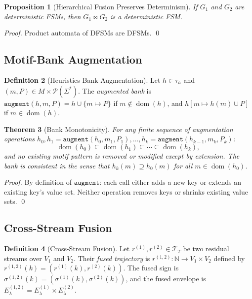 \documentclass[11pt,a4paper]{article}
\theoremstyle{plain}
\newtheorem{theorem}{Theorem}[section]
\newtheorem{proposition}[theorem]{Proposition}
\theoremstyle{definition}
\newtheorem{definition}[theorem]{Definition}
\theoremstyle{remark}
\DeclareMathOperator{\dom}{dom}
\newcommand{\N}{\mathbb{N}}
\begin{document}
\begin{proposition}[Hierarchical Fusion Preserves Determinism]
  If $G_1$ and $G_2$ are deterministic FSMs, then $G_1 \bowtie G_2$ is a deterministic FSM.
\end{proposition}
\begin{proof}
  Product automata of DFSMs are DFSMs. \qed
\end{proof}

\subsection{Motif-Bank Augmentation}

\begin{definition}[Heuristics Bank Augmentation]
  Let $h \in \tau_h$ and $(m, P) \in M \times \mathcal{P}(\Sigma^*)$. The \emph{augmented bank}
  is $\mathtt{augment}(h, m, P) = h \cup \{m \mapsto P\}$ if $m \notin \dom(h)$, and
  $h[m \mapsto h(m) \cup P]$ if $m \in \dom(h)$.
\end{definition}

\begin{theorem}[Bank Monotonicity]
\label{thm:bank_mono}
  For any finite sequence of augmentation operations
  $h_0, h_1 = \mathtt{augment}(h_0, m_1, P_1), \ldots, h_k = \mathtt{augment}(h_{k-1}, m_k, P_k)$:
  \begin{equation}
    \dom(h_0) \subseteq \dom(h_1) \subseteq \cdots \subseteq \dom(h_k),
  \end{equation}
  and no existing motif pattern is removed or modified except by extension. The bank is
  \emph{consistent} in the sense that $h_k(m) \supseteq h_0(m)$ for all $m \in \dom(h_0)$.
\end{theorem}
\begin{proof}
  By definition of $\mathtt{augment}$: each call either adds a new key or extends an existing
  key's value set. Neither operation removes keys or shrinks existing value sets. \qed
\end{proof}

\subsection{Cross-Stream Fusion}

\begin{definition}[Cross-Stream Fusion]
  Let $r^{(1)}, r^{(2)} \in \mathcal{T}_T$ be two residual streams over $V_1$ and $V_2$. Their
  \emph{fused trajectory} is $r^{(1,2)} : \N \to V_1 \times V_2$ defined by
  $r^{(1,2)}(k) = (r^{(1)}(k), r^{(2)}(k))$. The fused sign is
  $\sigma^{(1,2)}(k) = (\sigma^{(1)}(k), \sigma^{(2)}(k))$, and the fused envelope is
  $E^{(1,2)}_\lambda = E^{(1)}_\lambda \times E^{(2)}_\lambda$.
\end{definition}
\end{document}
